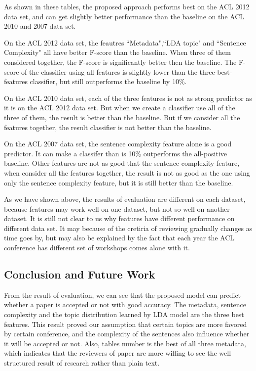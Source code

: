 \documentclass[11pt,letterpaper]{article}
\begin{document}
As shown in these tables,
the proposed approach performs best on the ACL 2012 data set,
and can get slightly better performance than the baseline on the ACL 2010 and 2007 data set.

On the ACL 2012 data set, the feautres ``Metadata",``LDA topic" and ``Sentence Complexity" 
all have better F-score than the baseline.
When three of them considered together, the F-score is significantly better then the baseline.
The F-score of the classifier using all features is slightly lower than the three-best-features classifier,
but still outperforms the baseline by 10\%.

On the ACL 2010 data set, each of the three features is not as strong predictor as it is on the ACL 2012 data set.
But when we create a classifier use all of the three of them, 
the result is better than the baseline. 
But if we cansider all the features together, 
the result classifier is not better than the baseline.

On the ACL 2007 data set, the sentence complexity feature alone is a good predictor.
It can make a classifer than is 10\% outperforms the all-positive baseline.
Other features are not as good that the sentence complexity feature,
when consider all the features together, the result is not as good as the one using only the sentence complexity feature,
but it is still better than the baseline.

As we have shown above, the results of evaluation are different on each dataset, because features may work well on one dataset, 
but not so well on another dataset.
It is still not clear to us why features have different performance on different data set.
It may because of the cretiria of reviewing gradually changes as time goes by, 
but may also be explained by the fact that each year the ACL conference has different set of workshops comes alone with it.


\subsection{Conclusion and Future Work} 
From the result of evaluation, we can see that the proposed model can predict whether a paper is accepted or not with good accuracy. 
The metadata, sentence complexity and the topic distribution learned by LDA model are the three best features.
This result proved our assumption that certain topics are more favored by certain conference,
and the complexity of the sentences also influence whether it will be accepted or not.
Also, tables number is the best of all three metadata, which indicates that the reviewers of paper are more willing to see the well structured result of research rather than plain text.
\end{document}
